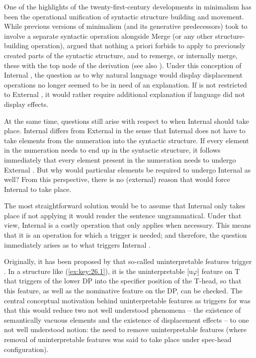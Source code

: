 \documentclass[output=paper]{langsci/langscibook}
\begin{document}
One of the highlights of the twenty-first-century developments in minimalism
has been the operational unification of syntactic structure building and
movement. While previous versions of minimalism (and its generative
predecessors) took  to involve a separate syntactic operation alongside
Merge (or any other structure-building operation), \citet{Chomsky2005} argued
that nothing a priori forbids  to apply to previously created parts
of the syntactic structure, and to remerge, or internally merge, these with the
top node of the derivation (see also \citealt{Starke2001}). Under this
conception of Internal , the question as to why natural language
would display displacement operations no longer seemed to be in need of an
explanation. If  is not restricted to External , it would
rather require additional explanation if language did not display 
effects.

At the same time, questions still arise with respect to when Internal 
should take place. Internal  differs from External  in
the sense that Internal  does not have to take elements from the
numeration into the syntactic structure. If every element in the numeration
needs to end up in the syntactic structure, it follows immediately that every
element present in the numeration needs to undergo External . But
why would particular elements be required to undergo Internal  as
well? From this perspective, there is no (external) reason that would force
Internal  to take place.

The most straightforward solution would be to assume that Internal 
only takes place if not applying it would render the sentence ungrammatical.
Under that view, Internal  is a costly operation that only applies
when necessary. This means that it is an operation for which a trigger is
needed; and therefore, the question immediately arises as to what triggers
Internal .

Originally, it has been proposed by \citet{Chomsky1995} that so-called
uninterpretable features trigger . In a structure like
(\ref{ex:key:26.1}), it is the uninterpretable [u${\varphi}$] feature on T that
triggers  of the lower DP into the specifier position of the T-head, so
that this feature, as well as the nominative feature on the DP, can be checked.
The central conceptual motivation behind uninterpretable features as triggers
for  was that this would reduce two not well understood phenomena
– the existence of semantically vacuous elements and the existence of
displacement effects – to one not well understood notion: the need to remove
uninterpretable features (where removal of uninterpretable features was said to
take place under spec-head configuration).
\end{document}
